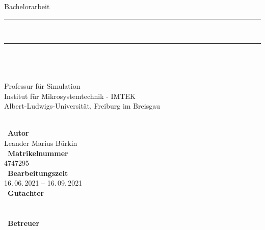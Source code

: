 \begin{titlepage}
\begin{center}
{\LARGE Bachelorarbeit}\\[2.3cm]
\newcommand{\HorizontalLine}{\rule{\linewidth}{0.3mm}}
\HorizontalLine \\[0.4cm]
{ \HUGE \bfseries \thetitle }
\HorizontalLine \\[1cm]

\setlength{\fboxrule}{3pt}
\setlength{\fboxsep}{0pt}
\\[4cm]
{\huge \theauthor} \\[0.2cm]

Professur für Simulation\\[-0.25cm]
Institut für Mikrosystemtechnik - IMTEK\\[-0.25cm]
Albert-Ludwigs-Universität, Freiburg im Breisgau
\end{center}
\end{titlepage}

\thispagestyle{empty}
\ \vfill \ \\
\
\textbf{Autor}                     \smallskip{} \\
Leander Marius Bürkin              \bigskip{} \\
\
\textbf{Matrikelnummer}            \smallskip{} \\
4747295                            \bigskip{} \\
\
\textbf{Bearbeitungszeit}           \smallskip{} \\
16.\,06.\,2021 -- 16.\,09.\,2021    \bigskip{} \\
\
\textbf{Gutachter}                  \smallskip{} \\
\firstexaminer                      \smallskip{} \\
\secondexaminer                     \bigskip{} \\
\
\textbf{Betreuer}                   \smallskip{} \\
\advisers